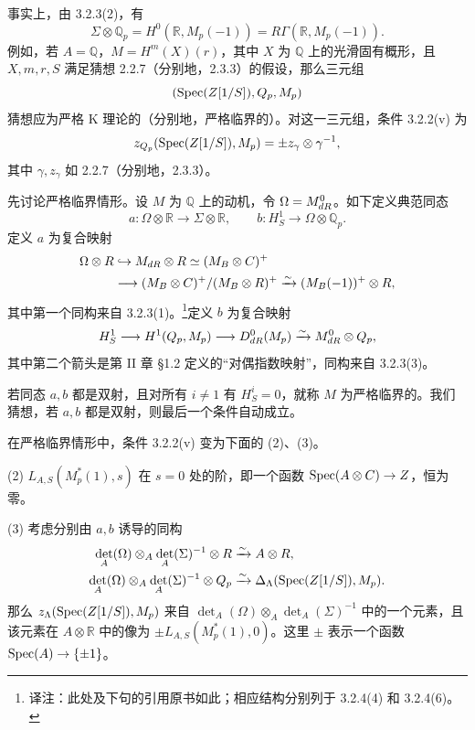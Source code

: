事实上，由 3.2.3(2)，有
\[
 \Sigma\otimes\mathbb Q_p=H^0(\mathbb R,M_p(-1))=R\Gamma(\mathbb R,M_p(-1)).
\]
例如，若 $A=\mathbb Q$，$M=H^m(X)(r)$，其中 $X$ 为 $\mathbb Q$ 上的光滑固有概形，且 $X,m,r,S$ 满足猜想 2.2.7（分别地，2.3.3）的假设，那么三元组
\[(\operatorname{Spec}(Z[1/S]),Q_p,M_p)\]
猜想应为严格 K 理论的（分别地，严格临界的）。对这一三元组，条件 3.2.2(v) 为
\[
 z_{Q_p}(\operatorname{Spec}(Z[1/S]),M_p)=\pm z_\gamma\otimes\gamma^{-1},
\]
其中 $\gamma,z_\gamma$ 如 2.2.7（分别地，2.3.3）。

先讨论严格临界情形。设 $M$ 为 $\mathbb Q$ 上的动机，令 $\Omega=M^0_{dR}$。如下定义典范同态
\[
 a:\Omega\otimes\mathbb R\longrightarrow\Sigma\otimes\mathbb R,
 \qquad b:H^1_S\longrightarrow\Omega\otimes\mathbb Q_p.
\]
定义 $a$ 为复合映射
\begin{align*}
 \Omega\otimes R&\hookrightarrow M_{dR}\otimes R
 \simeq(M_B\otimes C)^+\\
 &\longrightarrow(M_B\otimes C)^+/(M_B\otimes R)^+
 \xrightarrow{\sim}(M_B(-1))^+\otimes R,
\end{align*}
其中第一个同构来自 3.2.3(1)。\footnote{译注：此处及下句的引用原书如此；相应结构分别列于 3.2.4(4) 和 3.2.4(6)。}定义 $b$ 为复合映射
\[
 H^1_S\longrightarrow H^1(Q_p,M_p)
 \longrightarrow D^0_{dR}(M_p)\xrightarrow{\sim}M^0_{dR}\otimes Q_p,
\]
其中第二个箭头是第 II 章 §1.2 定义的“对偶指数映射”，同构来自 3.2.3(3)。

若同态 $a,b$ 都是双射，且对所有 $i\ne1$ 有 $H^i_S=0$，就称 $M$ 为严格临界的。我们猜想，若 $a,b$ 都是双射，则最后一个条件自动成立。

在严格临界情形中，条件 3.2.2(v) 变为下面的 (2)、(3)。

\noindent(2) $L_{A,S}(M_p^*(1),s)$ 在 $s=0$ 处的阶，即一个函数 $\operatorname{Spec}(A\otimes C)\to Z$，恒为零。

\noindent(3) 考虑分别由 $a,b$ 诱导的同构
\begin{align*}
 \det_A(\Omega)\otimes_A\det_A(\Sigma)^{-1}\otimes R
 &\xrightarrow{\sim}A\otimes R,\\
 \det_A(\Omega)\otimes_A\det_A(\Sigma)^{-1}\otimes Q_p
 &\xrightarrow{\sim}\Delta_\Lambda(\operatorname{Spec}(Z[1/S]),M_p).
\end{align*}
那么 $z_\Lambda(\operatorname{Spec}(Z[1/S]),M_p)$ 来自 $\det_A(\Omega)\otimes_A\det_A(\Sigma)^{-1}$ 中的一个元素，且该元素在 $A\otimes\mathbb R$ 中的像为 $\pm L_{A,S}(M_p^*(1),0)$。这里 $\pm$ 表示一个函数 $\operatorname{Spec}(A)\to\{\pm1\}$。

